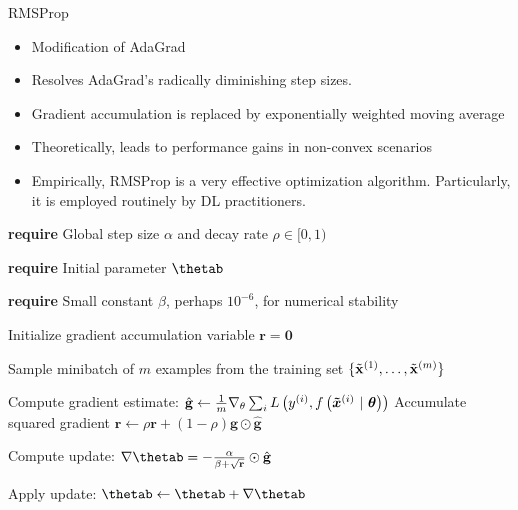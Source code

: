 \documentclass[11pt,compress,t,notes=noshow, xcolor=table]{beamer}
\begin{document}

\begin{vbframe}{RMSProp}
	\begin{itemize}
		\item Modification of AdaGrad
		\item Resolves AdaGrad's radically diminishing step sizes.
		\item Gradient accumulation is replaced by exponentially weighted moving average
		\item Theoretically, leads to performance gains in non-convex scenarios
		\item Empirically, RMSProp is a very effective optimization algorithm.
            Particularly, it is employed routinely by DL practitioners.
	\end{itemize}
	
	\framebreak
	
	
	\begin{algorithm}[H]
		\small
		\caption{RMSProp}
		\begin{algorithmic}[1]
			\State \textbf{require} Global step size $\alpha$ and decay rate $\rho \in [0, 1)$ \strut
			\State \textbf{require} Initial parameter $\mathbf{\thetab}$ \strut
			\State \parbox[t]{\dimexpr\linewidth-\algorithmicindent}{\textbf{require} Small constant $\beta$, perhaps $10^{-6}$, for numerical stability \strut}
			\State Initialize gradient accumulation variable $\mathbf{r} = \mathbf{0} $
			\State \parbox[t]{\dimexpr\linewidth-\algorithmicindent}{Sample minibatch of $m$ examples from the training set $\{\tilde{\mathbf{x}}^{(1)},\dots,\tilde{\mathbf{x}}^{(m)}\}$ \strut}
			\State Compute gradient estimate: $\hat{\mathbf{g}} \leftarrow \frac{1}{m} \nabla_\theta \sum_{i} L\left(y^{(i)}, f\left(\bm{\tilde{x}}^{(i)} ~|~ \bm{\theta}\right)\right)$
			\State Accumulate squared gradient $\mathbf{r} \leftarrow \rho \mathbf{r} + (1 - \rho) \hat{\mathbf{g}} \odot  \hat{\mathbf{g}}$
			\State \parbox[t]{\dimexpr\linewidth-\algorithmicindent}{Compute update: $\nabla\mathbf{\thetab} = - \frac{\alpha}{\beta + \sqrt\mathbf{r}} \odot \hat{\mathbf{g}}$ \strut}
			\State Apply update: $\mathbf{\thetab} \leftarrow \mathbf{\thetab} + \nabla\mathbf{\thetab}$
			\EndWhile
		\end{algorithmic}
	\end{algorithm}
\end{vbframe}
\end{document}

